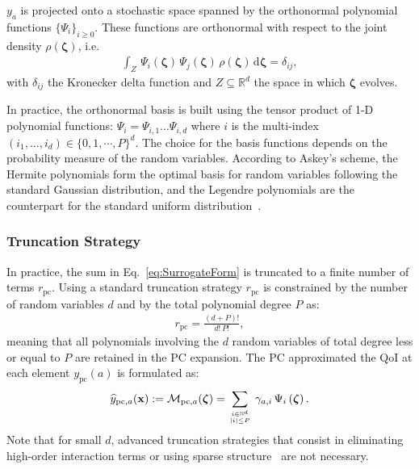$y_a$ is projected onto a stochastic space spanned by the orthonormal polynomial functions $\lbrace\Psi_{i}\rbrace_{i\geq 0}$. These functions are orthonormal with respect to the joint density $\rho(\boldsymbol{\zeta})$, i.e.
\begin{align}
\int_{Z}\,\Psi_i(\boldsymbol{\zeta})\,\Psi_j(\boldsymbol{\zeta})\,\rho(\boldsymbol{\zeta})\,\mathrm{d}\boldsymbol{\zeta} = \delta_{ij},
\label{eq:pc_innerproduct}
\end{align}
with $\delta_{ij}$ the Kronecker delta function and $Z \subseteq \mathbb{R}^d$ the space in which $\boldsymbol{\zeta}$ evolves.

In practice, the orthonormal basis is built using the tensor product of 1-D polynomial functions: $\Psi_i=\Psi_{i,1}\ldots\Psi_{i,d}$ where $i$ is the multi-index $(i_1,\ldots,i_d)\in\{0,1,\cdots,P\}^d$. The choice for the basis functions depends on the probability measure of the random variables. According to Askey's scheme, the Hermite polynomials form the optimal basis for random variables following the standard Gaussian distribution, and the Legendre polynomials are the counterpart for the standard uniform distribution~\citep{xiu2002}. 

\subsubsection{Truncation Strategy}

In practice, the sum in Eq.~\eqref{eq:SurrogateForm} is truncated to a finite number of terms $r_{\text{pc}}$. Using a standard truncation strategy $r_{\text{pc}}$ is constrained by the number of random variables $d$ and by the total polynomial degree $P$ as:
\begin{align}
r_{\text{pc}} = \frac{(d + P)!}{d!\,P!},
\label{eq:pc_order}
\end{align}
meaning that all polynomials involving the $d$ random variables of total degree less or equal to $P$ are retained in the PC expansion. The PC approximated the QoI at each element $y_{\text{pc}}(a)$ is formulated as:
\begin{align}
\widehat{y}_{\text{pc},a}(\mathbf{x}) := \mathcal{M}_{\text{pc},a}(\boldsymbol{\zeta}) = \displaystyle\sum_{i\in\mathbb{N}^d\atop|i|\leq P}\,\gamma_{a,i}\,\Psi_i\left(\boldsymbol{\zeta}\right).
\label{eq:SurrogatePC}
\end{align}
Note that for small $d$, advanced truncation strategies that consist in eliminating high-order interaction terms or using sparse structure~\citep{blatman2009phd,migliorati2013} are not necessary.

